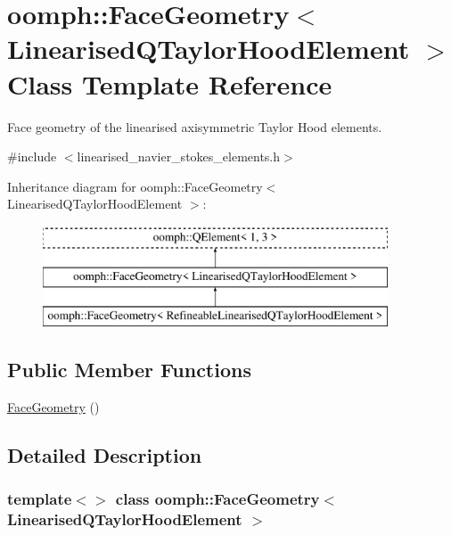 \hypertarget{classoomph_1_1FaceGeometry_3_01LinearisedQTaylorHoodElement_01_4}{}\section{oomph\+:\+:Face\+Geometry$<$ Linearised\+Q\+Taylor\+Hood\+Element $>$ Class Template Reference}
\label{classoomph_1_1FaceGeometry_3_01LinearisedQTaylorHoodElement_01_4}


Face geometry of the linearised axisymmetric Taylor Hood elements.  




{\ttfamily \#include $<$linearised\+\_\+navier\+\_\+stokes\+\_\+elements.\+h$>$}

Inheritance diagram for oomph\+:\+:Face\+Geometry$<$ Linearised\+Q\+Taylor\+Hood\+Element $>$\+:\begin{figure}[H]
\begin{center}
\leavevmode
\includegraphics[height=3.000000cm]{classoomph_1_1FaceGeometry_3_01LinearisedQTaylorHoodElement_01_4}
\end{center}
\end{figure}
\subsection*{Public Member Functions}
\begin{DoxyCompactItemize}
\item 
\hyperlink{classoomph_1_1FaceGeometry_3_01LinearisedQTaylorHoodElement_01_4_a9093144b0ed1d343a95921e75a1faa46}{Face\+Geometry} ()
\end{DoxyCompactItemize}


\subsection{Detailed Description}
\subsubsection*{template$<$$>$\newline
class oomph\+::\+Face\+Geometry$<$ Linearised\+Q\+Taylor\+Hood\+Element $>$}

